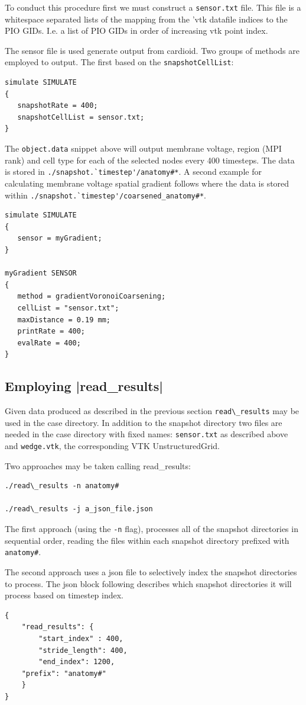 \documentclass{article}
\begin{document}
To conduct this procedure first we must construct a 
\verb|sensor.txt| file. This file is a whitespace separated lists of the mapping from the 'vtk datafile
indices to the PIO GIDs. I.e. a list of PIO GIDs in order of increasing vtk point
index.

The sensor file is used generate output from cardioid. Two groups of methods are employed to output. The first
based on the \verb|snapshotCellList|:
\begin{verbatim}
simulate SIMULATE
{
   snapshotRate = 400;
   snapshotCellList = sensor.txt;
}
\end{verbatim}
The \verb|object.data| snippet above will output membrane voltage, region (MPI rank)
and cell type for each of the selected nodes every 400 timesteps. The data is stored
in \verb|./snapshot.`timestep'/anatomy#*|. A second example for calculating membrane
voltage spatial gradient follows where the data is stored within  \verb|./snapshot.`timestep'/coarsened_anatomy#*|.
\begin{verbatim}
simulate SIMULATE
{
   sensor = myGradient;
}

myGradient SENSOR
{
   method = gradientVoronoiCoarsening;
   cellList = "sensor.txt";
   maxDistance = 0.19 mm;
   printRate = 400;
   evalRate = 400;
}
\end{verbatim}

\subsection{Employing |read\_results|}
Given data produced as described in the previous section \verb|read\_results| may
be used in the case directory. In addition to the snapshot directory two files are
needed in the case directory with fixed names: \verb|sensor.txt| as described above
and \verb|wedge.vtk|, the corresponding VTK UnstructuredGrid.

Two approaches may be taken calling read\_results:
\begin{verbatim}
./read\_results -n anatomy# 

./read\_results -j a_json_file.json
\end{verbatim}
The first approach (using the \verb|-n| flag), processes all of the snapshot
directories in sequential order, reading the files within each snapshot directory
prefixed with \verb|anatomy#|.

The second approach uses a json file to selectively index the snapshot directories
to process. The json block following describes which snapshot directories it will
process based on timestep index.
\begin{verbatim}
{
    "read_results": {
    	"start_index" : 400,
    	"stride_length": 400,
    	"end_index": 1200,
	"prefix": "anatomy#"
    }
}
\end{verbatim}
\end{document}
